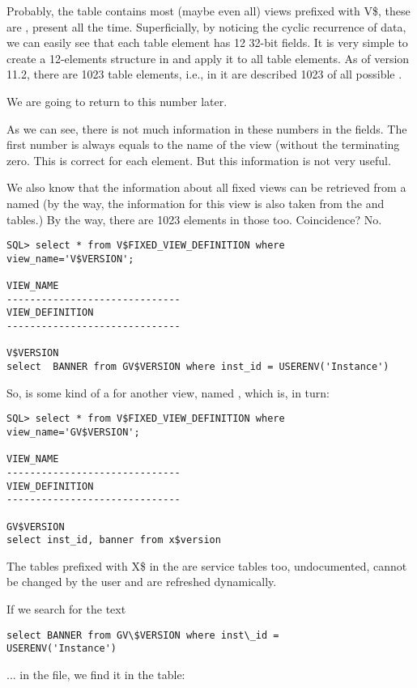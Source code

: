 Probably, the table  contains most (maybe even all) views prefixed with V\$, these are , present all the time.
Superficially, by noticing the cyclic recurrence of data, we can easily see that each  table element has 12 32-bit fields.
It is very simple to create a 12-elements structure in \IDA and apply it to all table elements.
As of \oracle version 11.2, there are 1023 table elements, i.e., in it are described 1023 of all possible .

We are going to return to this number later.

As we can see, there is not much information in these numbers in the fields. The first number is always equals to the name of the view (without the terminating zero.
This is correct for each element. But this information is not very useful.

We also know that the information about all fixed views can be retrieved from a  named 
(by the way, the information for this view is also taken from the  and  tables.)
By the way, there are 1023 elements in those too. Coincidence? No.

\begin{lstlisting}
SQL> select * from V$FIXED_VIEW_DEFINITION where view_name='V$VERSION';

VIEW_NAME
------------------------------
VIEW_DEFINITION
------------------------------

V$VERSION
select  BANNER from GV$VERSION where inst_id = USERENV('Instance')
\end{lstlisting}

So,  is some kind of a  for another view, named , which is, in turn:

\begin{lstlisting}
SQL> select * from V$FIXED_VIEW_DEFINITION where view_name='GV$VERSION';

VIEW_NAME
------------------------------
VIEW_DEFINITION
------------------------------

GV$VERSION
select inst_id, banner from x$version
\end{lstlisting}

The tables prefixed with X\$ in the \oracle are service tables too, undocumented, cannot be changed by the user and are refreshed dynamically.

If we search for the text \\
\begin{lstlisting}
select BANNER from GV\$VERSION where inst\_id = 
USERENV('Instance')
\end{lstlisting}
... 
in the  file, we find it in the  table:


